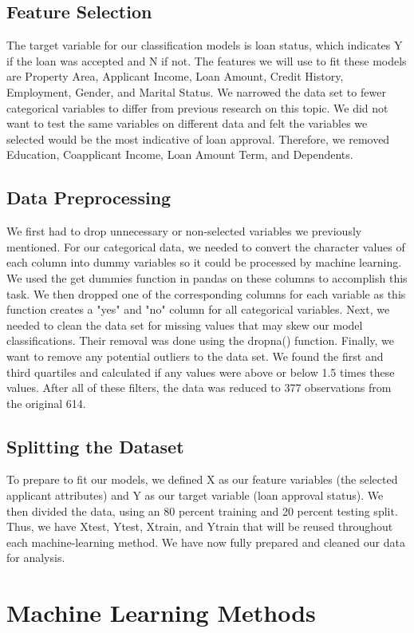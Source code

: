 \documentclass{article}
\begin{document}
\subsection{Feature Selection}
The target variable for our classification models is loan status, which indicates Y if the loan was accepted and N if not. The features we will use to fit these models are Property Area, Applicant Income, Loan Amount, Credit History, Employment, Gender, and Marital Status. We narrowed the data set to fewer categorical variables to differ from previous research on this topic. We did not want to test the same variables on different data and felt the variables we selected would be the most indicative of loan approval. Therefore, we removed Education, Coapplicant Income, Loan Amount Term, and Dependents.
\subsection{Data Preprocessing}
We first had to drop unnecessary or non-selected variables we previously mentioned. For our categorical data, we needed to convert the character values of each column into dummy variables so it could be processed by machine learning. We used the get dummies function in pandas on these columns to accomplish this task. We then dropped one of the corresponding columns for each variable as this function creates a "yes" and "no" column for all categorical variables. Next, we needed to clean the data set for missing values that may skew our model classifications. Their removal was done using the dropna() function. Finally, we want to remove any potential outliers to the data set. We found the first and third quartiles and calculated if any values were above or below 1.5 times these values. After all of these filters, the data was reduced to 377 observations from the original 614.   
\subsection{Splitting the Dataset}
To prepare to fit our models, we defined X as our feature variables (the selected applicant attributes) and Y as our target variable (loan approval status). We then divided the data, using an 80 percent training and 20 percent testing split. Thus, we have Xtest, Ytest, Xtrain, and Ytrain that will be reused throughout each machine-learning method. We have now fully prepared and cleaned our data for analysis.

\section{Machine Learning Methods}
\end{document}
